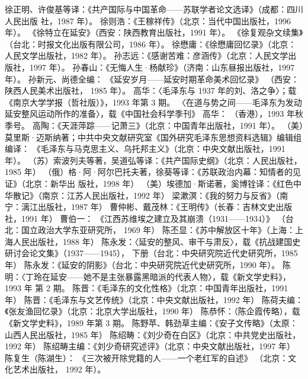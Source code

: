 \begin{thebibliography}{999}
\bibitem{} 徐正明、许俊基等译：《共产国际与中国革命——苏联学者论文选译》（成都：四川人民出版 社，1987 年）。
\bibitem{} 徐则浩：《王稼祥传》（北京：当代中国出版社，1996 年）。
\bibitem{} 《徐特立在延安》（西安：陕西教育出版社，1991 年）。
\bibitem{} 《徐复观杂文续集》（台北：时报文化出版有限公司，1986 年）。
\bibitem{} 徐懋庸：《徐懋庸回忆录》（北京：人民文学出版社，1982 年）。
\bibitem{} 孙志远：《感谢苦难：彦涵传》（北京：人民文学出版社，1997 年）。
\bibitem{} 孙春山：《无悔人生·杨献珍》（济南：山东昼报出版社，1997 年）。
\bibitem{} 孙新元、尚德全编： 《延安岁月——延安时期革命美术回忆录》 （西安：陕西人民美术出版社， 1985 年）。
\bibitem{} 高华：〈毛泽东与 1937 年的刘、洛之争〉；载《南京大学学报（哲社版）》，1993 年第 3 期。
\bibitem{} 〈在道与势之间——毛泽东为发动延安整风运动所作的准备〉，载《中国社会科学季刊》 高华： （香港），1993 年秋季号。
\bibitem{} 高陶：《天涯萍踪——记萧三》（北京：中国青年出版社，1991 年）。
\bibitem{} （美）莫里斯·迈斯纳著；中共中央文献研究室《国外研究毛泽东思想资料选辑》编辑组编译： 《毛泽东与马克思主义、乌托邦主义》（北京：中央文献出版社，1991 年）。
\bibitem{} （苏）索波列夫等著，吴道弘等译：《共产国际史纲》（北京：人民出版社，1985 年）
\bibitem{} （俄）格·阿·阿尔巴托夫著，徐葵等译：《苏联政治内幕：知情者的见证》（北京：新华出 版社，1998 年）
\bibitem{} （美）埃德加·斯诺著，奚博铨译：《红色中华散记》（南京：江苏人民出版社，1992 年）
\bibitem{} 梁漱溟：《我的努力与反省》（南宁：漓江出版社，1987 年）
\bibitem{} 曹仲彬、戴茂林：《王明传》（长春：吉林文史出版社，1991 年）
\bibitem{} 曹伯一： 《江西苏维埃之建立及其崩溃（1931——1934）》 （台北：国立政治大学东亚研究所， 1969 年）
\bibitem{} 陈丕显：《苏中解放区十年》（上海：上海人民出版社，1988 年）
\bibitem{} 陈永发：〈延安的整风、审干与肃反〉，载《抗战建国史研讨会论文集》（1937——1945）， 下册（台北：中央研究院近代史研究所，1985 年）
\bibitem{} 陈永发：《延安的阴影》（台北：中央研究院近代史研究所，1990 年）。
\bibitem{} 陈明：〈丁玲在延安——她不是主张暴露黑暗派的代表人物〉，载《新文学史料》，1993 年 第 2 期。
\bibitem{} 陈晋：《毛泽东的文化性格》（北京：中国青年出版社，1991 年）
\bibitem{} 陈晋：《毛泽东与文艺传统》（北京：中央文献出版社，1992 年）
\bibitem{} 陈荷夫编：《张友渔回忆录》（北京：北京大学出版社，1990 年）
\bibitem{} 陈恭怀：（陈企霞传略），载《新文学史料》，1989 年第 3 期。
\bibitem{} 陈野苹、韩劲草主编：《安子文传略》（太原：山西人民出版社，1985 年）
\bibitem{} 陈绍畴：《刘少奇在白区》（北京：中共党史出版社，1992 年）
\bibitem{} 陈绍畴主编：《刘少奇研究述评》（北京：中央文献出版社，1997 年）
\bibitem{} 陈复生（陈湖生）： 《三次被开除党籍的人——一个老红军的自述》 （北京：文化艺术出版社， 1992 年）。

\end{thebibliography}
